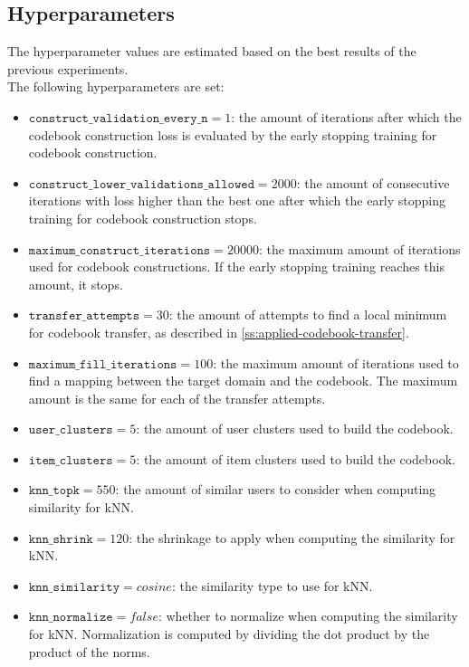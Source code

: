 \subsection{Hyperparameters}

The hyperparameter values are estimated based on the best results of the previous experiments.\\
The following hyperparameters are set:
\begin{itemize}
\item $\texttt{construct\_validation\_every\_n} = 1$: the amount of iterations after which the codebook construction loss is evaluated by the early stopping training for codebook construction.
\item $\texttt{construct\_lower\_validations\_allowed} = 2000$: the amount of consecutive iterations with loss higher than the best one after which the early stopping training for codebook construction stops.
\item $\texttt{maximum\_construct\_iterations} = 20000$: the maximum amount of iterations used for codebook constructions. If the early stopping training reaches this amount, it stops.
\item $\texttt{transfer\_attempts} = 30$: the amount of attempts to find a local minimum for codebook transfer, as described in \autoref{ss:applied-codebook-transfer}.
\item $\texttt{maximum\_fill\_iterations} = 100$: the maximum amount of iterations used to find a mapping between the target domain and the codebook. The maximum amount is the same for each of the transfer attempts.
\item $\texttt{user\_clusters} = 5$: the amount of user clusters used to build the codebook.
\item $\texttt{item\_clusters} = 5$: the amount of item clusters used to build the codebook.
\item $\texttt{knn\_topk} = 550$: the amount of similar users to consider when computing similarity for kNN.
\item $\texttt{knn\_shrink} = 120$: the shrinkage to apply when computing the similarity for kNN.
\item $\texttt{knn\_similarity} = cosine$: the similarity type to use for kNN.
\item $\texttt{knn\_normalize} = false$: whether to normalize when computing the similarity for kNN. Normalization is computed by dividing the dot product by the product of the norms.
\end{itemize}


